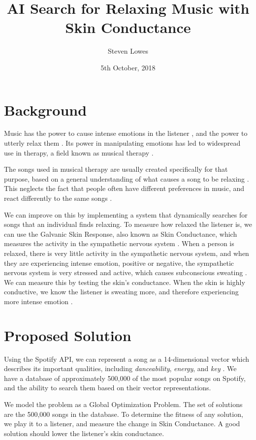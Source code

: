 \documentclass{article}
\title{AI Search for Relaxing Music with Skin Conductance}
\author{Steven Lowes}
\date{5th October, 2018}
\begin{document}
	\maketitle
	
	\section{Background}
	Music has the power to cause intense emotions in the listener \cite{}, and the power to utterly relax them \cite{}. Its power in manipulating emotions has led to widespread use in therapy, a field known as musical therapy \cite{}.
	
	The songs used in musical therapy are usually created specifically for that purpose, based on a general understanding of what causes a song to be relaxing \cite{}. This neglects the fact that people often have different preferences in music, and react differently to the same songs \cite{}.
	
	We can improve on this by implementing a system that dynamically searches for songs that an individual finds relaxing. To measure how relaxed the listener is, we can use the Galvanic Skin Response, also known as Skin Conductance, which measures the activity in the sympathetic nervous system \cite{}. When a person is relaxed, there is very little activity in the sympathetic nervous system, and when they are experiencing intense emotion, positive or negative, the sympathetic nervous system is very stressed and active, which causes subconscious sweating \cite{}. We can measure this by testing the skin's conductance. When the skin is highly conductive, we know the listener is sweating more, and therefore experiencing more intense emotion \cite{}.
	
	\section{Proposed Solution}
	Using the Spotify API, we can represent a song as a 14-dimensional vector which describes its important qualities, including \emph{danceability}, \emph{energy}, and \emph{key} \cite{spotify_get_nodate, jehan_analyzer_nodate}. We have a database of approximately 500,000 of the most popular songs on Spotify, and the ability to search them based on their vector representations.
	
	We model the problem as a Global Optimization Problem. The set of solutions are the 500,000 songs in the database. To determine the fitness of any solution, we play it to a listener, and measure the change in Skin Conductance. A good solution should lower the listener's skin conductance.
	
\end{document}
